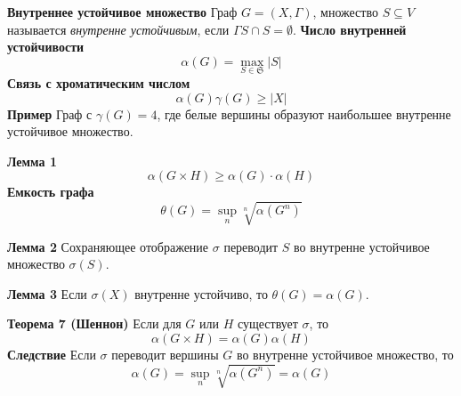 \textbf{Внутреннее устойчивое множество}
Граф $G = (X, \Gamma)$, множество $S \subseteq V$ называется \textit{внутренне устойчивым}, если $\Gamma S \cap S = \emptyset$.
\textbf{Число внутренней устойчивости}
\[
\alpha(G) = \max_{S \in \mathfrak{S}} |S|
\]
\textbf{Связь с хроматическим числом}
\[
\alpha(G) \gamma(G) \geq |X|
\]
\textbf{Пример}
Граф с $\gamma(G) = 4$, где белые вершины образуют наибольшее внутренне устойчивое множество.

\textbf{Лемма 1}
\[
\alpha(G \times H) \geq \alpha(G) \cdot \alpha(H)
\]
\textbf{Емкость графа}
\[
\theta(G) = \sup_{n} \sqrt[n]{\alpha(G^n)}
\]

\textbf{Лемма 2}
Сохраняющее отображение $\sigma$ переводит $S$ во внутренне устойчивое множество $\sigma(S)$.

\textbf{Лемма 3}
Если $\sigma(X)$ внутренне устойчиво, то $\theta(G) = \alpha(G)$.

\textbf{Теорема 7 (Шеннон)}
Если для $G$ или $H$ существует $\sigma$, то
\[
\alpha(G \times H) = \alpha(G)\alpha(H)
\]
\textbf{Следствие}
Если $\sigma$ переводит вершины $G$ во внутренне устойчивое множество, то
\[
\alpha(G) = \sup_n \sqrt[n]{\alpha(G^n)} = \alpha(G)
\]
